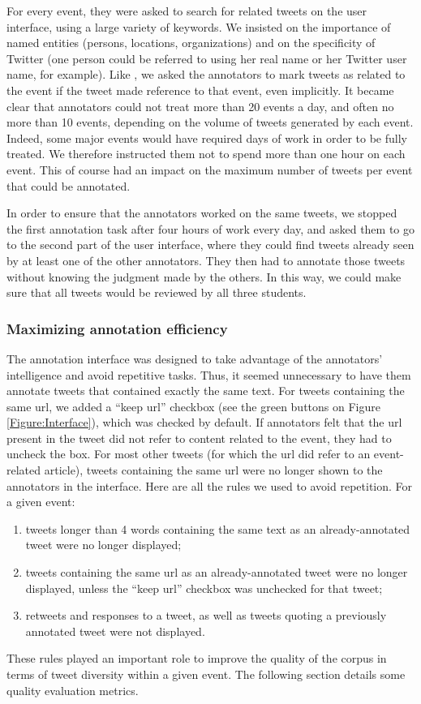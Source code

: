For every event, they were asked to search for related tweets on the user interface, using a large variety of keywords. We insisted on the importance of named entities (persons, locations, organizations) and on the specificity of Twitter (one person could be referred to using her real name or her Twitter user name, for example). Like \citet{mcminn_building_2013}, we asked the annotators to mark tweets as related to the event if the tweet made reference to that event, even implicitly. It became clear that annotators could not treat more than 20 events a day, and often no more than 10 events, depending on the volume of tweets generated by each event. Indeed, some major events would have required days of work in order to be fully treated. We therefore instructed them not to spend more than one hour on each event. This of course had an impact on the maximum number of tweets per event that could be annotated. 

In order to ensure that the annotators worked on the same tweets, we stopped the first annotation task after four hours of work every day, and asked them to go to the second part of the user interface, where they could find tweets already seen by at least one of the other annotators. They then had to annotate those tweets without knowing the judgment made by the others. In this way, we could make sure that all tweets would be reviewed by all three students.

\subsubsection{Maximizing annotation efficiency}
\label{annotation efficiency}
The annotation interface was designed to take
advantage of the annotators’ intelligence and avoid
repetitive tasks. Thus, it seemed unnecessary to have
them annotate tweets that contained exactly the same text.
For tweets containing the same url, we added a “keep url”
checkbox (see the green buttons on Figure \ref{Figure:Interface}), which was
checked by default. If annotators felt that the url present in
the tweet did not refer to content related to the event, they
had to uncheck the box. For most other tweets (for which
the url did refer to an event-related article), tweets
containing the same url were no longer shown to the
annotators in the interface.
Here are all the rules we used to avoid repetition. For
a given event:
\begin{enumerate}
    \item tweets longer than 4 words containing the same text as
an already-annotated tweet were no longer displayed;
    \item tweets containing the same url as an already-annotated
tweet were no longer displayed, unless the “keep url”
checkbox was unchecked for that tweet;
    \item retweets and responses to a tweet, as well as tweets
quoting a previously annotated tweet were not displayed.
\end{enumerate}
These rules played an important role to improve the
quality of the corpus in terms of tweet diversity within a
given event. The following section details some quality
evaluation metrics.

